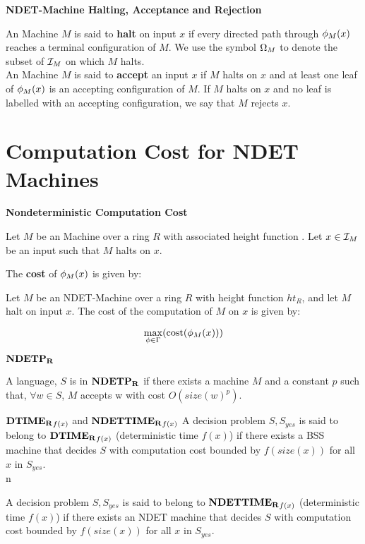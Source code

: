 \begin{definition} \textbf{NDET-Machine Halting, Acceptance and Rejection}

  An \ndet Machine $M$ is said to \textbf{halt} on input $x$ if every
  directed path through $\phi_M(x)$ reaches a terminal
  configuration of $M$.  We use the symbol $\Omega_M$ to
  denote the subset of $\mathcal{I}_M$ on which $M$ halts. \\

  An \ndet Machine $M$ is said to \textbf{accept} an input $x$ if $M$
  halts on $x$ and at least one leaf of $\phi_M(x)$ is an
  accepting configuration of $M$. If $M$ halts on $x$ and no leaf is
  labelled with an accepting configuration, we say that $M$ rejects
  $x$.
  
\end{definition}

\section{Computation Cost for  NDET Machines}

\begin{definition}{\textbf{Nondeterministic Computation Cost}}

  Let $M$ be an \ndet Machine over a ring $R$ with associated height
  function .  Let $x \in \mathcal{I}_M$ be an
  input such that $M$ halts on $x$.  

  The \textbf{cost} of $\phi_M(x)$ is given by:
  

  Let $M$ be an NDET-Machine over a ring $R$ with height function
  $ht_R$, and let $M$ halt on input $x$.  The cost of the computation
  of $M$ on $x$ is given by:
  
  $$\max_{\phi \in \Gamma}(\text{cost}(\phi_M(x)))$$

\end{definition}

\begin{definition} $\mathbf{NDETP_R}$
  
  A language, $S$ is in $\mathbf{NDETP_R}$ if there exists a machine $M$ and a
  constant $p$ such that, $\forall w \in S$, $M$ accepts w with cost
  $O(size(w)^p)$.
  
\end{definition}

\begin{definition} $\mathbf{DTIME_R}_{f(x)}$ and $\mathbf{NDETTIME_R}_{f(x)}$
  A decision problem $S, S_{yes}$ is said to belong to
  $\mathbf{DTIME_R}_{f(x)}$ (deterministic time $f(x)$) if there exists a BSS
  machine that decides $S$ with computation cost bounded by
  $f(size(x))$ for all $x$ in $S_{yes}$.  \\n
  
  A decision problem $S, S_{yes}$ is said to belong to
  $\mathbf{NDETTIME_R}_{f(x)}$ (deterministic time $f(x)$) if there exists an
  NDET machine that decides $S$ with computation cost bounded by
  $f(size(x))$ for all $x$ in $S_{yes}$.  \\
\end{definition}

